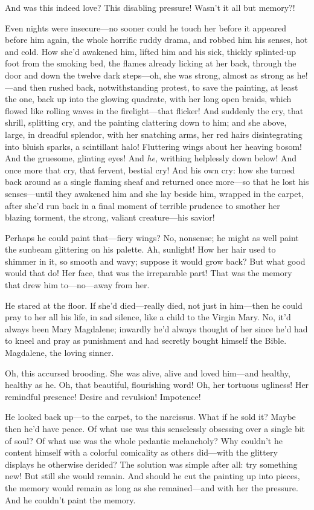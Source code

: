 \documentclass[12pt,a4paper]{article}
\begin{document}
And was this indeed love? This disabling pressure! Wasn’t it all but memory?!

Even nights were insecure—no sooner could he touch her before it appeared before him again, the whole horrific ruddy drama, and robbed him his senses, hot and cold. How she’d awakened him, lifted him and his sick, thickly splinted-up foot from the smoking bed, the flames already licking at her back, through the door and down the twelve dark steps—oh, she was strong, almost as strong as he!—and then rushed back, notwithstanding protest, to save the painting, at least the one, back up into the glowing quadrate, with her long open braids, which flowed like rolling waves in the firelight—that flicker! And suddenly the cry, that shrill, splitting cry, and the painting clattering down to him; and she above, large, in dreadful splendor, with her snatching arms, her red hairs disintegrating into bluish sparks, a scintillant halo! Fluttering wings about her heaving bosom! And the gruesome, glinting eyes! And \textit{he}, writhing helplessly down below! And once more that cry, that fervent, bestial cry! And his own cry: how she turned back around as a single flaming sheaf and returned once more—so that he lost his senses—until they awakened him and she lay beside him, wrapped in the carpet, after she’d run back in a final moment of terrible prudence to smother her blazing torment, the strong, valiant creature—his savior!

Perhaps he could paint that—fiery wings? No, nonsense; he might as well paint the sunbeam glittering on his palette. Ah, sunlight! How her hair used to shimmer in it, so smooth and wavy; suppose it would grow back? But what good would that do! Her face, that was the irreparable part! That was the memory that drew him to—no—away from her.

He stared at the floor. If she’d died—really died, not just in him—then he could pray to her all his life, in sad silence, like a child to the Virgin Mary. No, it’d always been Mary Magdalene; inwardly he’d always thought of her since he’d had to kneel and pray as punishment and had secretly bought himself the Bible. Magdalene, the loving sinner.

Oh, this accursed brooding. She was alive, alive and loved him—and healthy, healthy as he. Oh, that beautiful, flourishing word! Oh, her tortuous ugliness! Her remindful presence! Desire and revulsion! Impotence!

He looked back up—to the carpet, to the narcissus. What if he sold it? Maybe then he’d have peace. Of what use was this senselessly obsessing over a single bit of soul? Of what use was the whole pedantic melancholy? Why couldn’t he content himself with a colorful comicality as others did—with the glittery displays he otherwise derided? The solution was simple after all: try something new! But still she would remain. And should he cut the painting up into pieces, the memory would remain as long as she remained—and with her the pressure. And he couldn’t paint the memory.
\end{document}

